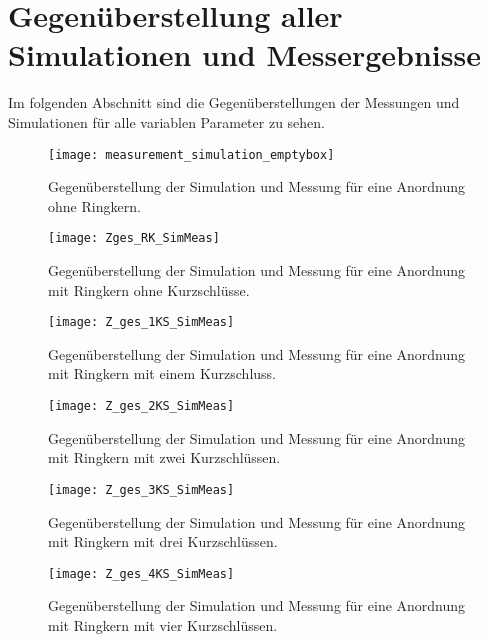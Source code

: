 \section{Gegen\"uberstellung aller Simulationen und Messergebnisse}
\label{sec:simmesskomplett}
Im folgenden Abschnitt sind die Gegen\"uberstellungen der Messungen und Simulationen f\"ur alle variablen Parameter zu sehen.

\begin{figure}[htb]
	\centering
	\texttt{[image: measurement\_simulation\_emptybox]}
	\caption{Gegen\"uberstellung der Simulation und Messung f\"ur eine Anordnung ohne Ringkern.}
	\label{fig:boxpolycrossrkappend}
\end{figure}

\begin{figure}[htb]
	\centering
	\texttt{[image: Zges\_RK\_SimMeas]}
	\caption{Gegen\"uberstellung der Simulation und Messung f\"ur eine Anordnung mit Ringkern ohne Kurzschl\"usse.}
	\label{fig:boxpolycrossrkappend}
\end{figure}

\begin{figure}[htb]
	\centering
	\texttt{[image: Z\_ges\_1KS\_SimMeas]}
	\caption{Gegen\"uberstellung der Simulation und Messung f\"ur eine Anordnung mit Ringkern mit einem Kurzschluss.}
	\label{fig:boxpolycrossrk1ksappend}
\end{figure}

\begin{figure}[htb]
	\centering
	\texttt{[image: Z\_ges\_2KS\_SimMeas]}
	\caption{Gegen\"uberstellung der Simulation und Messung f\"ur eine Anordnung mit Ringkern mit zwei Kurzschl\"ussen.}
	\label{fig:boxpolycrossrk2ksappend}
\end{figure}

\begin{figure}[htb]
	\centering
	\texttt{[image: Z\_ges\_3KS\_SimMeas]}
	\caption{Gegen\"uberstellung der Simulation und Messung f\"ur eine Anordnung mit Ringkern mit drei Kurzschl\"ussen.}
	\label{fig:boxpolycrossrk3ksappend}
\end{figure}

\begin{figure}[htb]
	\centering
	\texttt{[image: Z\_ges\_4KS\_SimMeas]}
	\caption{Gegen\"uberstellung der Simulation und Messung f\"ur eine Anordnung mit Ringkern mit vier Kurzschl\"ussen.}
	\label{fig:boxpolycrossrk4ksappend}
\end{figure}

